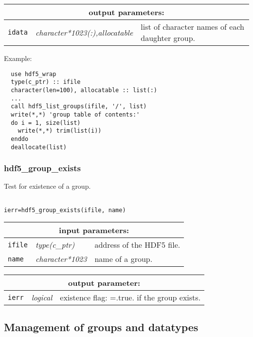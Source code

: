 \vskip 0.8cm

\noindent
\begin{tabular}{|p{1.5cm}|p{4.5cm}|p{8.5cm}|}
\hline
\multicolumn{3}{|c|}{\bf output parameters:} \\
\hline
{\tt idata} & {\it character*1023(:),allocatable} & list of character names of each daughter group.\\
\hline
\end{tabular}

\vskip 0.5cm

\noindent Example:
\begin{verbatim}
  use hdf5_wrap
  type(c_ptr) :: ifile
  character(len=100), allocatable :: list(:)
  ...
  call hdf5_list_groups(ifile, '/', list)
  write(*,*) 'group table of contents:'
  do i = 1, size(list)
    write(*,*) trim(list(i))
  enddo
  deallocate(list)
\end{verbatim}

\subsubsection{hdf5\_group\_exists}

Test for existence of a group.

\begin{verbatim}

ierr=hdf5_group_exists(ifile, name)
\end{verbatim}

\noindent
\begin{tabular}{|p{1.5cm}|p{3cm}|p{10cm}|}
\hline
\multicolumn{3}{|c|}{\bf input parameters:} \\
\hline
{\tt ifile} & {\it type(c\_ptr)} & address of the HDF5 file. \\
\hline
{\tt name} & {\it character*1023} & name of a group. \\
\hline
\end{tabular}

\vskip 0.8cm

\noindent
\begin{tabular}{|p{1.5cm}|p{3cm}|p{10cm}|}
\hline
\multicolumn{3}{|c|}{\bf output parameter:} \\
\hline
{\tt ierr} & {\it logical} & existence flag: =.true. if the group exists. \\
\hline
\end{tabular}

\vskip 0.8cm

\subsection{Management of groups and datatypes}

